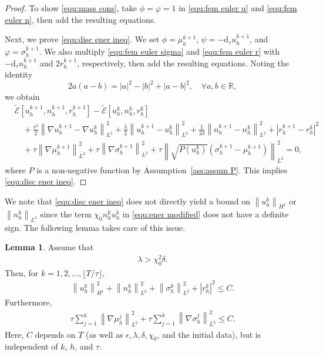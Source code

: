 \documentclass[11pt, reqno]{amsart}
\theoremstyle{definition}
\newtheorem{lemma}[theorem]{Lemma}
\numberwithin{equation}{section}
\newcommand{\bb}{\mathbb}
\newcommand{\dtt}{\mathrm{d}_\tau}
\newcommand{\norm}[2]{\left\|{#1}\right\|_{#2}}
\newcommand{\abs}[1]{\left|{#1}\right|}
\begin{document}
\begin{proof}
To show \eqref{equ:mass cons}, take $\phi=\varphi=1$ {in \eqref{equ:fem euler u} and \eqref{equ:fem euler n}}, then add the resulting equations.	

Next, we prove \eqref{equ:disc ener ineq}. We set $\phi=\mu_h^{k+1}$, $\psi=-\dtt u_h^{k+1}$, and $\varphi=\sigma_h^{k+1}$. We also multiply \eqref{equ:fem euler sigma} and \eqref{equ:fem euler r} with $-\dtt n_h^{k+1}$ and $2r_h^{k+1}$, respectively, then add the resulting equations. Noting the identity
\begin{equation}\label{equ:ab ide}
	2a(a-b)=\abs{a}^2-\abs{b}^2 + \abs{a-b}^2, \quad \forall a,b\in \bb{R},
\end{equation}
we obtain
\begin{align}\label{equ:Ek1 min Ek}
	&\widetilde{\mathcal{E}}[u_h^{k+1}, n_h^{k+1}, r_h^{k+1}] - \widetilde{\mathcal{E}}[u_h^k, n_h^k, r_h^k]
	\nonumber\\
	&\quad
	+
	\frac{\epsilon^2}{2} \norm{\nabla u_h^{k+1}-\nabla u_h^k}{L^2}^2
	+
	\frac{\lambda}{2} \norm{u_h^{k+1}- u_h^k}{L^2}^2
	+
	\frac{1}{2\delta} \norm{n_h^{k+1}-n_h^k}{L^2}^2
	+
	\abs{r_h^{k+1}-r_h^k}^2
	\nonumber\\
	&\quad
	+
	\tau \norm{\nabla \mu_h^{k+1}}{L^2}^2
	+
	\tau \norm{\nabla \sigma_h^{k+1}}{L^2}^2
	+
	{\tau} \norm{\sqrt{P(u_h^k)} \left(\sigma_h^{k+1}-\mu_h^{k+1}\right)}{L^2}^2
	= 0,
\end{align}
where $P$ is a non-negative function by Assumption~\ref{ass:assum P}.
This implies \eqref{equ:disc ener ineq}.
\end{proof}

We note that \eqref{equ:disc ener ineq} does not directly yield a bound on $\norm{u_h^k}{H^1}$ or $\norm{n_h^k}{L^2}$ since the term $\chi_0 n_h^k u_h^k$ {in \eqref{equ:ener modified}} does not have a definite sign. The following lemma takes care of this issue.


\begin{lemma}\label{lem:stab u H1}
Assume that
\begin{align}\label{equ:ass lambda ener}
	\lambda> \chi_0^2 \delta.
\end{align}
Then, for $k=1,2,\ldots, \lfloor T/\tau \rfloor$,
\begin{align}\label{equ:stab u H1 n L2}
	\norm{u_h^k}{H^1}^2 + \norm{n_h^k}{L^2}^2 + \norm{\sigma_h^k}{L^2}^2 + |r_h^k|^2 \leq C.
\end{align}
Furthermore,
\begin{align}\label{equ:stab sum mu sigma H1}
	\tau \sum_{j=1}^k \norm{\nabla \mu_h^j}{L^2}^2
	+
	\tau \sum_{j=1}^k \norm{\nabla \sigma_h^j}{L^2}^2
	\leq C.
\end{align}
Here, $C$ depends on $T$ (as well as $\epsilon, \lambda, \delta, \chi_0$, and the initial data), but is independent of $k$, $h$, and $\tau$.
\end{lemma}
\end{document}
